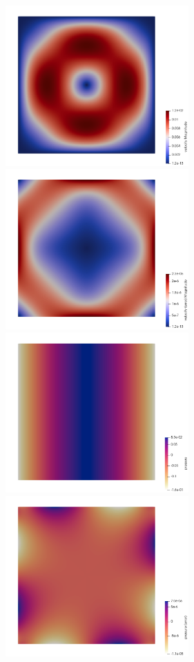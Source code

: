 \begin{center}
\includegraphics[width=7cm]{python_codes/fieldstone_158/results/exp4/vel}
\includegraphics[width=7cm]{python_codes/fieldstone_158/results/exp4/vel_error}\\
\includegraphics[width=7cm]{python_codes/fieldstone_158/results/exp4/press}
\includegraphics[width=7cm]{python_codes/fieldstone_158/results/exp4/press_error}\\

\end{center}
